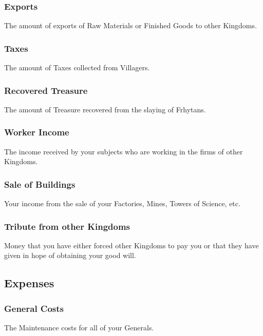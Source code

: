 \subsubsection{Exports}

The amount of exports of Raw Materials or Finished Goods to other Kingdoms.

\subsubsection{Taxes}

The amount of Taxes collected from Villagers.

\subsubsection{Recovered Treasure}

The amount of Treasure recovered from the slaying of Frhytans.

\subsubsection{Worker Income}

The income received by your subjects who are working in the firms of other Kingdoms.

\subsubsection{Sale of Buildings}

Your income from the sale of your Factories, Mines, Towers of Science, etc.

\subsubsection{Tribute from other Kingdoms}

Money that you have either forced other Kingdoms to pay you or that they have given in hope of obtaining your good will.

\subsection{Expenses}

\subsubsection{General Costs}

The Maintenance costs for all of your Generals.

